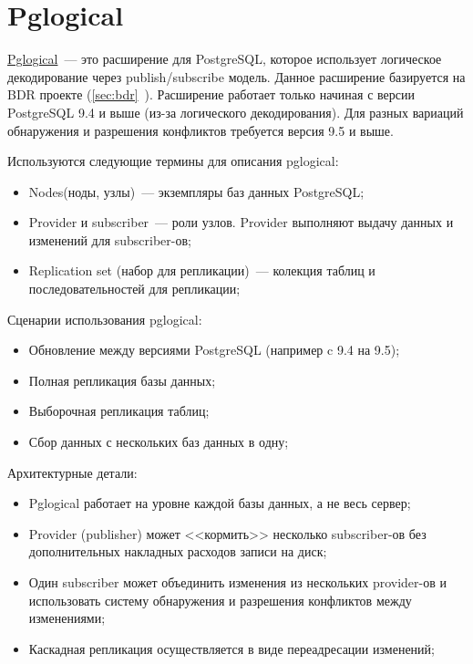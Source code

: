 \section{Pglogical}
\label{sec:pglogical}

\href{https://2ndquadrant.com/en/resources/pglogical/}{Pglogical}~--- это расширение для PostgreSQL, которое использует логическое декодирование через publish/subscribe модель. Данное расширение базируется на BDR проекте (\ref{sec:bdr}~). Расширение работает только начиная с версии PostgreSQL 9.4 и выше (из-за логического декодирования). Для разных вариаций обнаружения и разрешения конфликтов требуется версия 9.5 и выше.

Используются следующие термины для описания pglogical:

\begin{itemize}
  \item Nodes(ноды, узлы)~--- экземпляры баз данных PostgreSQL;
  \item Provider и subscriber~--- роли узлов. Provider выполняют выдачу данных и изменений для subscriber-ов;
  \item Replication set (набор для репликации)~--- колекция таблиц и последовательностей для репликации;
\end{itemize}

Сценарии использования pglogical:

\begin{itemize}
  \item Обновление между версиями PostgreSQL (например c 9.4 на 9.5);
  \item Полная репликация базы данных;
  \item Выборочная репликация таблиц;
  \item Сбор данных с нескольких баз данных в одну;
\end{itemize}

Архитектурные детали:

\begin{itemize}
  \item Pglogical работает на уровне каждой базы данных, а не весь сервер;
  \item Provider (publisher) может <<кормить>> несколько subscriber-ов без дополнительных накладных расходов записи на диск;
  \item Один subscriber может объединить изменения из нескольких provider-ов и использовать систему обнаружения и разрешения конфликтов между изменениями;
  \item Каскадная репликация осуществляется в виде переадресации изменений;
\end{itemize}


